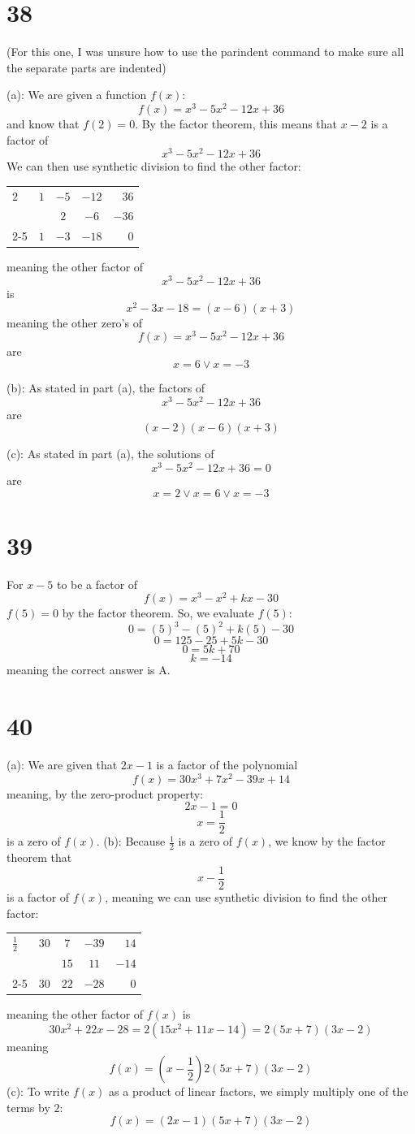 \documentclass{article}
\theoremstyle{definition}
\begin{document}
\newpage
\section*{38}
(For this one, I was unsure how to use the parindent command to make sure all the separate parts are indented)\newline


(a): We are given a function $f(x)$:
\[ f(x)=x^3-5x^2-12x+36 \] and know that $f(2)=0$. By the factor theorem, this means that $x-2$ is a factor of
\[ x^3-5x^2-12x+36 \]
We can then use synthetic division to find the other factor:
\FloatBarrier
	\begin{center}
		\begin{tabular}{l|cccr}
			$2$ & $1$ & $-5$ & $-12$ & $36$ \\
			& & $2$ & $-6$ & $-36$ \\[-4.75pt]
			\cmidrule{2-5}
			& $1$ & $-3$ & $-18$ & $0$
		\end{tabular}
	\end{center}
\FloatBarrier
meaning the other factor of
\[ x^3-5x^2-12x+36\] is \[ x^2-3x-18=(x-6)(x+3) \] meaning the other zero's of \[ f(x)=x^3-5x^2-12x+36 \] are \[ x=6\vee x=-3 \]


(b): As stated in part (a), the factors of \[ x^3-5x^2-12x+36 \] are \[ (x-2)(x-6)(x+3) \]


(c): As stated in part (a), the solutions of \[ x^3-5x^2-12x+36=0 \] are \[ x=2\vee x=6\vee x=-3 \]

\newpage
\section*{39}
For $x-5$ to be a factor of
\[ f(x)=x^3-x^2+kx-30 \] $f(5)=0$ by the factor theorem. So, we evaluate $f(5)$:
\[ 0=(5)^3-(5)^2+k(5)-30 \] \[ 0=125-25+5k-30 \] \[ 0=5k+70 \] \[ k=-14 \]
meaning the correct answer is A.

\section*{40}
(a): We are given that $2x-1$ is a factor of the polynomial
\[ f(x)=30x^3+7x^2-39x+14 \]
meaning, by the zero-product property:
\[ 2x-1=0 \] \[ x=\frac{1}{2} \] is a zero of $f(x)$.\newline
(b): Because $\frac{1}{2}$ is a zero of $f(x)$, we know by the factor theorem that \[ x-\frac{1}{2} \] is a factor of $f(x)$, meaning we can use 
synthetic division to find the other factor:
\FloatBarrier
	\begin{center}
		\begin{tabular}{l|cccr}
			$\frac{1}{2}$ & $30$ & $7$ & $-39$ & $14$ \\
			& & $15$ & $11$ & $-14$ \\[-4.75pt]
			\cmidrule{2-5} 
			& $30$ & $22$ & $-28$ & $0$ 
		\end{tabular}
	\end{center}
\FloatBarrier
meaning the other factor of $f(x)$ is
\[ 30x^2+22x-28=2(15x^2+11x-14)=2(5x+7)(3x-2) \]
meaning
\[ f(x)=(x-\frac{1}{2})2(5x+7)(3x-2) \]
(c): To write $f(x)$ as a product of linear factors, we simply multiply one of the terms by $2$:
\[ f(x)=(2x-1)(5x+7)(3x-2) \]
\end{document}
